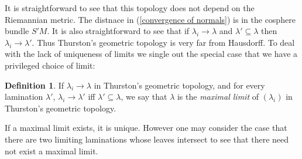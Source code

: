 \documentclass[reqno,11pt]{amsart}
\newcommand{\RR}{\mathbf{R}}
\newcommand{\dfn}[1]{\emph{#1}\index{#1}}
\newtheorem{lemma}[theorem]{Lemma}
\theoremstyle{definition}
\newtheorem{definition}[theorem]{Definition}
\numberwithin{equation}{section}
\begin{document}
It is straightforward to see that this topology does not depend on the Riemannian metric.
The distnace in (\ref{convergence of normals}) is in the cosphere bundle $S'M$.
It is also straightforward to see that if $\lambda_i \to \lambda$ and $\lambda' \subseteq \lambda$ then $\lambda_i \to \lambda'$.
Thus Thurston's geometric topology is very far from Hausdorff.
To deal with the lack of uniqueness of limits we single out the special case that we have a privileged choice of limit:

\begin{definition}
If $\lambda_i \to \lambda$ in Thurston's geometric topology, and for every lamination $\lambda'$, $\lambda_i \to \lambda'$ iff $\lambda' \subseteq \lambda$, we say that $\lambda$ is the \dfn{maximal limit} of $(\lambda_i)$ in Thurston's geometric topology.
\end{definition}

If a maximal limit exists, it is unique.
However one may consider the case that there are two limiting laminations whose leaves intersect to see that there need not exist a maximal limit.


\end{document}
